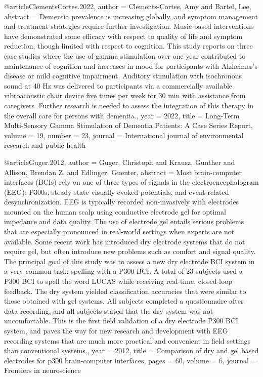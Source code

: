 @article{ClementsCortes.2022,
 author = {Clements-Cortes, Amy and Bartel, Lee},
 abstract = {Dementia prevalence is increasing globally, and symptom management and treatment strategies require further investigation. Music-based interventions have demonstrated some efficacy with respect to quality of life and symptom reduction, though limited with respect to cognition. This study reports on three case studies where the use of gamma stimulation over one year contributed to maintenance of cognition and increases in mood for participants with Alzheimer's disease or mild cognitive impairment. Auditory stimulation with isochronous sound at 40 Hz was delivered to participants via a commercially available vibroacoustic chair device five times per week for 30 min with assistance from caregivers. Further research is needed to assess the integration of this therapy in the overall care for persons with dementia.},
 year = {2022},
 title = {{Long-Term Multi-Sensory Gamma Stimulation of Dementia Patients: A Case Series Report}},
 volume = {19},
 number = {23},
 journal = {{International journal of environmental research and public health}}
}


@article{Guger.2012,
 author = {Guger, Christoph and Krausz, Gunther and Allison, Brendan Z. and Edlinger, Guenter},
 abstract = {Most brain-computer interfaces (BCIs) rely on one of three types of signals in the electroencephalogram (EEG): P300s, steady-state visually evoked potentials, and event-related desynchronization. EEG is typically recorded non-invasively with electrodes mounted on the human scalp using conductive electrode gel for optimal impedance and data quality. The use of electrode gel entails serious problems that are especially pronounced in real-world settings when experts are not available. Some recent work has introduced dry electrode systems that do not require gel, but often introduce new problems such as comfort and signal quality. The principal goal of this study was to assess a new dry electrode BCI system in a very common task: spelling with a P300 BCI. A total of 23 subjects used a P300 BCI to spell the word {\textquotedbl}LUCAS{\textquotedbl} while receiving real-time, closed-loop feedback. The dry system yielded classification accuracies that were similar to those obtained with gel systems. All subjects completed a questionnaire after data recording, and all subjects stated that the dry system was not uncomfortable. This is the first field validation of a dry electrode P300 BCI system, and paves the way for new research and development with EEG recording systems that are much more practical and convenient in field settings than conventional systems.},
 year = {2012},
 title = {{Comparison of dry and gel based electrodes for p300 brain-computer interfaces}},
 pages = {60},
 volume = {6},
 journal = {{Frontiers in neuroscience}}
}


